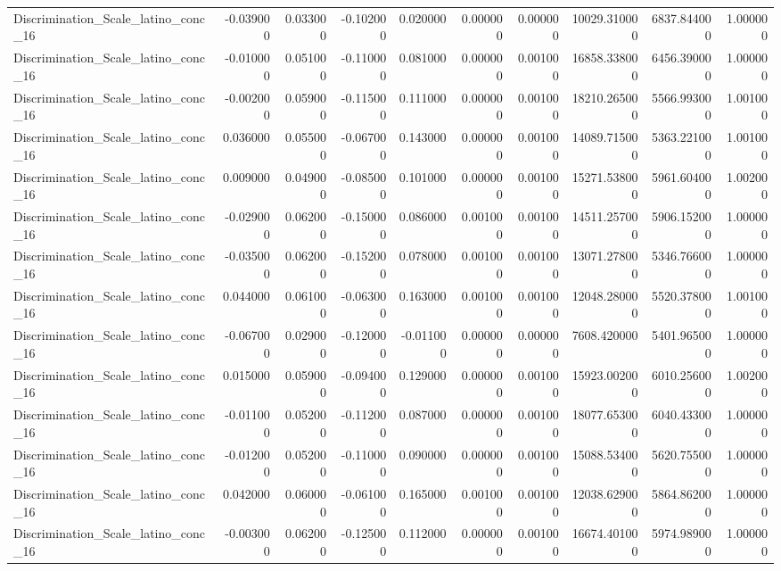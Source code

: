 \begin{table}
\begin{tabular}{lrrrrrrrrr}
Discrimination_Scale_latino_conc_16 & -0.039000 & 0.033000 & -0.102000 & 0.020000 & 0.000000 & 0.000000 & 10029.310000 & 6837.844000 & 1.000000 \\
Discrimination_Scale_latino_conc_16 & -0.010000 & 0.051000 & -0.110000 & 0.081000 & 0.000000 & 0.001000 & 16858.338000 & 6456.390000 & 1.000000 \\
Discrimination_Scale_latino_conc_16 & -0.002000 & 0.059000 & -0.115000 & 0.111000 & 0.000000 & 0.001000 & 18210.265000 & 5566.993000 & 1.001000 \\
Discrimination_Scale_latino_conc_16 & 0.036000 & 0.055000 & -0.067000 & 0.143000 & 0.000000 & 0.001000 & 14089.715000 & 5363.221000 & 1.001000 \\
Discrimination_Scale_latino_conc_16 & 0.009000 & 0.049000 & -0.085000 & 0.101000 & 0.000000 & 0.001000 & 15271.538000 & 5961.604000 & 1.002000 \\
Discrimination_Scale_latino_conc_16 & -0.029000 & 0.062000 & -0.150000 & 0.086000 & 0.001000 & 0.001000 & 14511.257000 & 5906.152000 & 1.000000 \\
Discrimination_Scale_latino_conc_16 & -0.035000 & 0.062000 & -0.152000 & 0.078000 & 0.001000 & 0.001000 & 13071.278000 & 5346.766000 & 1.000000 \\
Discrimination_Scale_latino_conc_16 & 0.044000 & 0.061000 & -0.063000 & 0.163000 & 0.001000 & 0.001000 & 12048.280000 & 5520.378000 & 1.001000 \\
Discrimination_Scale_latino_conc_16 & -0.067000 & 0.029000 & -0.120000 & -0.011000 & 0.000000 & 0.000000 & 7608.420000 & 5401.965000 & 1.000000 \\
Discrimination_Scale_latino_conc_16 & 0.015000 & 0.059000 & -0.094000 & 0.129000 & 0.000000 & 0.001000 & 15923.002000 & 6010.256000 & 1.002000 \\
Discrimination_Scale_latino_conc_16 & -0.011000 & 0.052000 & -0.112000 & 0.087000 & 0.000000 & 0.001000 & 18077.653000 & 6040.433000 & 1.000000 \\
Discrimination_Scale_latino_conc_16 & -0.012000 & 0.052000 & -0.110000 & 0.090000 & 0.000000 & 0.001000 & 15088.534000 & 5620.755000 & 1.000000 \\
Discrimination_Scale_latino_conc_16 & 0.042000 & 0.060000 & -0.061000 & 0.165000 & 0.001000 & 0.001000 & 12038.629000 & 5864.862000 & 1.000000 \\
Discrimination_Scale_latino_conc_16 & -0.003000 & 0.062000 & -0.125000 & 0.112000 & 0.000000 & 0.001000 & 16674.401000 & 5974.989000 & 1.000000 \\

\end{tabular}
\end{table}
